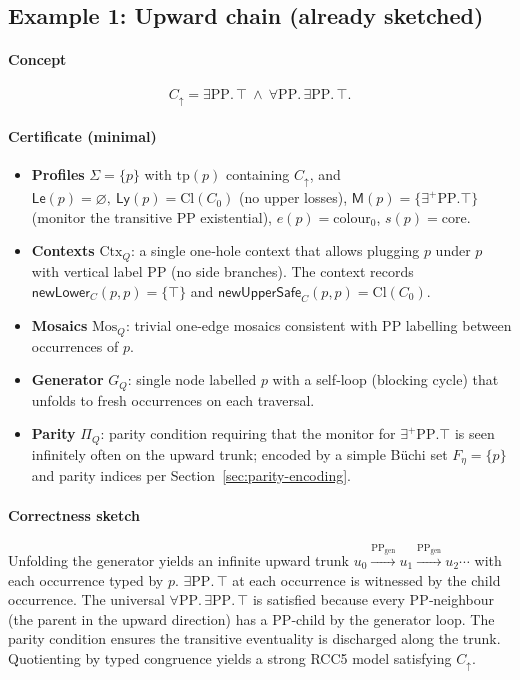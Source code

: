 \documentclass[11pt]{article}
\newcommand{\PP}{\mathrm{PP}}
\newcommand{\PPgen}{\xrightarrow{\mathrm{PP}_{\mathrm{gen}}}}
\newcommand{\some}[2]{\exists #1.\,#2}   %
\newcommand{\all}[2]{\forall #1.\,#2}   %
\newcommand{\Cl}{\mathrm{Cl}}
\newcommand{\tp}{\mathrm{tp}}
\begin{document}
\subsection{Example 1: Upward chain (already sketched)}
\label{app:chain}

\paragraph{Concept}


\[
C_\uparrow=\some{\PP}{\top}\ \land\ \all{\PP}{\some{\PP}{\top}}.
\]



\paragraph{Certificate (minimal)}
\begin{itemize}
  \item \textbf{Profiles} $\Sigma=\{p\}$ with
    \(\tp(p)\) containing $C_\uparrow$, and
    \(\mathsf{Le}(p)=\varnothing,\ \mathsf{Ly}(p)=\Cl(C_0)\) (no upper losses),
    \(\mathsf{M}(p)=\{\exists^{+}\PP.\top\}\) (monitor the transitive PP existential),
    \(e(p)=\text{colour}_0\), \(s(p)=\mathrm{core}\).
  \item \textbf{Contexts} $\mathrm{Ctx}_Q$: a single one‑hole context that
    allows plugging $p$ under $p$ with vertical label $\PP$ (no side branches).
    The context records $\mathsf{newLower}_C(p,p)=\{\top\}$ and
    $\mathsf{newUpperSafe}_C(p,p)=\Cl(C_0)$.
  \item \textbf{Mosaics} $\mathrm{Mos}_Q$: trivial one‑edge mosaics consistent
    with $\PP$ labelling between occurrences of $p$.
  \item \textbf{Generator} $G_Q$: single node labelled $p$ with a self‑loop
    (blocking cycle) that unfolds to fresh occurrences on each traversal.
  \item \textbf{Parity} $\Pi_Q$: parity condition requiring that the monitor
    for $\exists^{+}\PP.\top$ is seen infinitely often on the upward trunk;
    encoded by a simple Büchi set $F_\eta=\{p\}$ and parity indices per
    Section~\ref{sec:parity-encoding}.
\end{itemize}

\paragraph{Correctness sketch}
Unfolding the generator yields an infinite upward trunk
\(u_0 \PPgen u_1 \PPgen u_2 \cdots\) with each occurrence typed by $p$.
\(\some{\PP}{\top}\) at each occurrence is witnessed by the child occurrence.
The universal $\all{\PP}{\some{\PP}{\top}}$ is satisfied because every
$\PP$‑neighbour (the parent in the upward direction) has a $\PP$‑child by the
generator loop. The parity condition ensures the transitive eventuality is
discharged along the trunk. Quotienting by typed congruence yields a strong
RCC5 model satisfying $C_\uparrow$.
\end{document}
